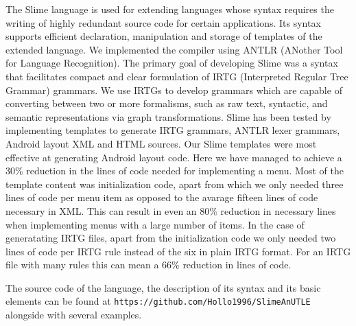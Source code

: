 The Slime language is used for extending languages whose syntax requires the writing of highly redundant source code for certain applications. 
Its syntax supports efficient declaration, manipulation and storage of templates of the extended language. 
We implemented the compiler using ANTLR (ANother Tool for Language Recognition). 
The primary goal of developing Slime was a syntax that facilitates compact and clear formulation of IRTG (Interpreted Regular Tree Grammar) grammars. 
We use IRTGs to develop grammars which are capable of converting between two or more formalisms, such as raw text, syntactic, and semantic representations via graph transformations. 
Slime has been tested by implementing templates to generate IRTG grammars, ANTLR lexer grammars, Android layout XML and HTML sources.
Our Slime templates were most effective at generating Android layout code. Here we have managed to achieve a 30\% reduction in the lines of code needed
for implementing a menu. Most of the template content was initialization code, apart from which we only needed three lines of code per menu item as opposed to the avarage fifteen lines of code necessary in XML. This can result in even an 80\% reduction in necessary lines when implementing menus with a large number of items. In the case of generatating IRTG files, apart from the initialization code we only needed two lines of code per IRTG rule instead of the six in plain IRTG format. For an IRTG file with many rules this can mean a 66\% reduction in lines of code.

The source code of the language, the description of its syntax and its basic elements can be found at \texttt{https://github.com/Hollo1996/SlimeAnUTLE} alongside with several examples.

\vfill
\selectthesislanguage

\setcounter{romanPage}{\value{page}}
